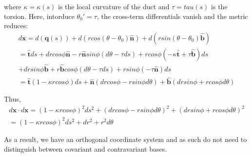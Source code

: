 \documentclass{Note}
\begin{document}
where $\kappa=\kappa(s)$ is the local curvature of the duct and $\tau=tau(s)$ is the torsion. Here, intorduce $\theta_0'=\tau$, the cross-term differentials vanish and the metric reduces:
\begin{equation}
\begin{aligned}
d\textbf{x}=d(\textbf{q}(s))+d(rcos(\theta-\theta_0) \widehat{\textbf{n}})+d(rsin(\theta-\theta_0)\widehat{\textbf{b}})\\
=\widehat{\textbf{t}}ds +dr cos\phi \widehat{\textbf{n}}-r\widehat{\textbf{n}} sin\phi (d\theta-\tau ds)+r cos\phi (-\kappa \widehat{\textbf{t}}+\tau \widehat{\textbf{b}})ds\\
+dr sin\phi \widehat{\textbf{b}}+r\widehat{\textbf{b}} cos\phi (d\theta-\tau ds)+r sin\phi (-\tau \widehat{\textbf{n}})ds\\
=\widehat{\textbf{t}}(1-\kappa r cos\phi)ds+\widehat{\textbf{n}}(dr cos\phi-rsin\phi d\theta)+\widehat{\textbf{b}}(dr sin\phi+rcos\phi d\theta)
\end{aligned}
\end{equation}

Thus,
\begin{equation}
\begin{aligned}
d\textbf{x}\cdot d\textbf{x}
={(1-\kappa r cos\phi)}^2ds^2+{(dr cos\phi-rsin\phi d\theta)}^2+{(dr sin\phi+rcos\phi d\theta)}^2\\
={(1-\kappa r cos\phi)}^2ds^2+dr^2+r^2d\theta
\end{aligned}
\end{equation}

As a result, we have an orthogonal coordinate system and as such do not need to distinguish between covariant and contravariant bases.
\end{document}
